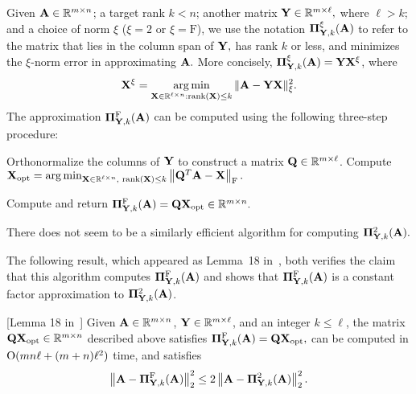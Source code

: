 Given $\mathbf{A} \in \mathbb{R}^{m \times n}$;
a target rank $k < n$; another matrix $\mathbf{Y} \in \mathbb{R}^{m \times \ell},$ 
where $\ell > k$; and a choice of norm $\xi$ ($\xi=2$ or $\xi = \mathrm{F}$), 
we use the notation $\boldsymbol{\Pi}_{\mathbf{Y},k}^\xi(\mathbf{A})$ to refer to the matrix
that lies in the column span of $\mathbf{Y},$ has rank $k$ or less, and minimizes the $\xi$-norm error in approximating $\mathbf{A}.$
More concisely, $\boldsymbol{\Pi}_{\mathbf{Y},k}^\xi(\mathbf{A}) = \mathbf{Y}\mathbf{X}^\xi$, where
%
$$
\mathbf{X}^\xi = \operatorname*{arg\,min}_{\mathbf{X} \in {\ensuremath{\mathbb{R}}}^{\ell \times n}:\mathrm{rank}(\mathbf{X})\leq k}\mbox{}\|\mathbf{A}-
\mathbf{Y}\mathbf{X}\|_{\xi}^2.
$$
%
The approximation $\boldsymbol{\Pi}_{\mathbf{Y},k}^{\mathrm{F}}(\mathbf{A})$ can be computed using
the following three-step procedure:
%
\begin{center}
\begin{algorithmic}[1]
%
\State Orthonormalize the columns of $\mathbf{Y}$ to construct a matrix 
 $\mathbf{Q} \in \mathbb{R}^{m \times \ell}$. %
%
\State Compute $\mathbf{X}_{\mathrm{opt}} = \operatorname*{arg\,min}_{\mathbf{X} \in \mathbb{R}^{\ell \times n},\,\, \mathrm{rank}(\mathbf{X}) \le k}\left\| \mathbf{Q}^T \mathbf{A} - \mathbf{X} \right\|_\mathrm{F}.$ 

\State Compute and return %
$\boldsymbol{\Pi}_{\mathbf{Y}, k}^{\mathrm{F}}(\mathbf{A}) = \mathbf{Q}\mathbf{X}_{\mathrm{opt}} \in \mathbb{R}^{m \times n}.$ 
%
\end{algorithmic}
\end{center}
%
There does not seem to be a similarly efficient algorithm for computing 
$\boldsymbol{\Pi}_{\mathbf{Y},k}^2(\mathbf{A}).$ 

The following result, which appeared as Lemma~18
in~\cite{BDM11a}, both verifies the claim that this algorithm computes 
$\boldsymbol{\Pi}_{\mathbf{Y},k}^{\mathrm{F}}(\mathbf{A})$ and shows that 
 $\boldsymbol{\Pi}_{\mathbf{Y},k}^{\mathrm{F}}(\mathbf{A})$ is a constant factor approximation to
 $\boldsymbol{\Pi}_{\mathbf{Y},k}^{2}(\mathbf{A})$.
%
\begin{lemma}\label{chprelim:lem:bestF}[Lemma 18 in~\cite{BDM11a}]
Given $\mathbf{A} \in {\ensuremath{\mathbb{R}}}^{m \times n}$, $\mathbf{Y}\in\mathbb{R}^{m\times \ell}$,
and an integer $k \le \ell$,  the matrix
$\mathbf{Q}\mathbf{X}_{\mathrm{opt}} \in \mathbb{R}^{m \times n}$
 described above satisfies $\boldsymbol{\Pi}_{\mathbf{Y},k}^{\mathrm{F}}(\mathbf{A}) = \mathbf{Q}\mathbf{X}_{\mathrm{opt}},$
 can be computed in
$\mathrm{O}(mn\ell + (m+n)\ell^2)$ time, and satisfies
%
\[
\left\|\mathbf{A}-\boldsymbol{\Pi}_{\mathbf{Y},k}^{\mathrm{F}}(\mathbf{A})\right\|_2^2 \leq 2\left\|\mathbf{A}-\boldsymbol{\Pi}_{\mathbf{Y},k}^{2}(\mathbf{A})\right\|_2^2.
\]
%
\end{lemma}

